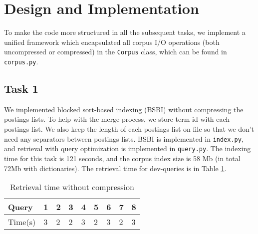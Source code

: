 
\usepackage{graphicx,amssymb,amsmath,enumerate}
\usepackage{courier}
\usepackage{color}
\usepackage{listings}
\usepackage{fancyvrb}
\usepackage{stmaryrd}

\oddsidemargin 0in
\evensidemargin 0in
\textwidth 6.5in
\topmargin -0.5in
\textheight 9.0in




\pagestyle{myheadings}  %

\section{Design and Implementation}

To make the code more structured in all the subsequent tasks, we implement a unified framework which encapsulated all corpus I/O operations (both uncompressed or compressed) in the \verb|Corpus| class, which can be found in \verb|corpus.py|.

\subsection{Task 1}

We implemented blocked sort-based indexing (BSBI) without compressing the postings lists. 
To help with the merge process, we store term id with each postings list. 
We also keep the length of each postings list on file so that we don't need any separators between postings lists. BSBI is implemented in \verb|index.py|, and retrieval with query optimization is implemented in \verb|query.py|.
The indexing time for this task is 121 seconds, and the corpus index size is 58 Mb (in total 72Mb with dictionaries). The retrieval time for dev-queries is in Table \ref{tab:1}.

\begin{table}[h!]
\begin{center}
\begin{tabular}{|l|llllllll|}
  \hline
  Query & 1 & 2 & 3 & 4 & 5 & 6 & 7 & 8 \\
  \hline
  Time(s) & 3 & 2 & 2 & 3 & 2 & 3 & 2 & 3 \\
  \hline
\end{tabular}
\caption{Retrieval time without compression}
\label{tab:1}
\end{center}
\end{table}

